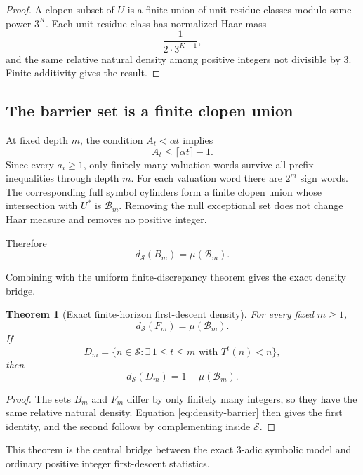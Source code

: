 \documentclass[11pt]{article}
\newtheorem{theorem}{Theorem}[section]
\theoremstyle{definition}
\theoremstyle{remark}
\newcommand{\Sset}{\mathcal S}
\newcommand{\ds}{d_{\Sset}}
\begin{document}
\begin{proof}
A clopen subset of $U$ is a finite union of unit residue classes modulo some power $3^K$.  Each unit residue class has normalized Haar mass
\[
\frac{1}{2\cdot3^{K-1}},
\]
and the same relative natural density among positive integers not divisible by $3$.  Finite additivity gives the result.
\end{proof}

\subsection{The barrier set is a finite clopen union}

At fixed depth $m$, the condition $A_t<\alpha t$ implies
\[
A_t\le\lceil\alpha t\rceil-1.
\]
Since every $a_i\ge1$, only finitely many valuation words survive all prefix inequalities through depth $m$.  For each valuation word there are $2^m$ sign words.  The corresponding full symbol cylinders form a finite clopen union whose intersection with $U^\ast$ is $\mathcal B_m$.  Removing the null exceptional set does not change Haar measure and removes no positive integer.

Therefore
\begin{equation}
\ds(B_m)=\mu(\mathcal B_m).
\label{eq:density-barrier}
\end{equation}

Combining with the uniform finite-discrepancy theorem gives the exact density bridge.

\begin{theorem}[Exact finite-horizon first-descent density]
For every fixed $m\ge1$,
\begin{equation}
\boxed{
\ds(F_m)=\mu(\mathcal B_m).
}
\label{eq:exact-density}
\end{equation}
If
\[
D_m=\{n\in\Sset:\exists\,1\le t\le m\text{ with }T^t(n)<n\},
\]
then
\begin{equation}
\boxed{
\ds(D_m)=1-\mu(\mathcal B_m).
}
\label{eq:descent-density}
\end{equation}
\end{theorem}

\begin{proof}
The sets $B_m$ and $F_m$ differ by only finitely many integers, so they have the same relative natural density.  Equation \eqref{eq:density-barrier} then gives the first identity, and the second follows by complementing inside $\Sset$.
\end{proof}

This theorem is the central bridge between the exact $3$-adic symbolic model and ordinary positive integer first-descent statistics.
\end{document}
